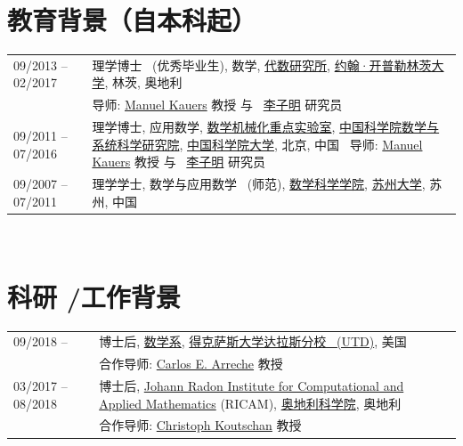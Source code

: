 \documentclass[a4paper,12pt]{article}
\begin{document}
\begin{CJK*}{UTF8}{gbsn}

\section*{\Large{教育背景（自本科起）}}
\begin{tabular}{@{}p{1.4in}p{4in}}
09/2013 -- 02/2017    & 理学博士 \ (优秀毕业生), 数学,  
                        \href{http://www.jku.at/algebra/content}{代数研究所}, 
                        \href{http://www.jku.at/content}{约翰·开普勒林茨大学}, 林茨, 奥地利 \\                        
                      & 导师: \href{http://www.kauers.de/}{Manuel Kauers} 教授 与  
                         \ \href{http://mmrc.iss.ac.cn/~zmli/}{李子明} 研究员\\
09/2011 -- 07/2016    & 理学博士,  应用数学, 
                        \href{http://english.mmrc.amss.cas.cn/}{数学机械化重点实验室}, 
                        \href{http://www.amss.ac.cn/}{中国科学院数学与系统科学研究院}, 
                        \href{http://www.gucas.ac.cn/}{中国科学院大学}, 北京, 中国 
                        \ 导师: \href{http://www.kauers.de/}{Manuel Kauers} 教授 与  
                         \ \href{http://mmrc.iss.ac.cn/~zmli/}{李子明} 研究员\\
09/2007 -- 07/2011    & 理学学士, 数学与应用数学 \ (师范), \href{http://math.suda.edu.cn/}{数学科学学院}, 
                        \href{http://www.suda.edu.cn/}{苏州大学}, 苏州, 中国
\end{tabular} \\


\section*{\Large{科研 \slash 工作背景}}
\begin{tabular}{@{}p{1.4in}p{4in}}
09/2018 --            & 博士后, \href{https://www.utdallas.edu/math/}{数学系}, 
                        \href{https://www.utdallas.edu/}{得克萨斯大学达拉斯分校 \ (UTD)}, 美国 \\
                      & 合作导师: \href{https://www.utdallas.edu/~arreche/}{Carlos E. Arreche} 教授 \\ 
03/2017 -- 08/2018        & 博士后, 
                        \href{https://www.ricam.oeaw.ac.at/}{Johann Radon Institute for Computational and Applied Mathematics} (RICAM),
                        \href{http://www.oeaw.ac.at/en/austrian-academy-of-sciences/}{奥地利科学院}, 奥地利 \\                       
                       & 合作导师: \href{http://www.koutschan.de/}{Christoph Koutschan} 教授\\
\end{tabular}


\end{CJK*}
\end{document}
